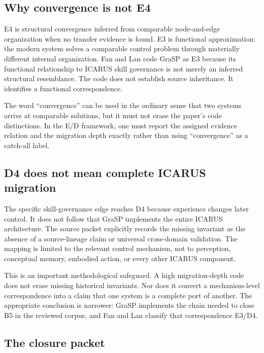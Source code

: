 \subsection{Why convergence is not E4}

E4 is structural convergence inferred from comparable node-and-edge organization when no transfer evidence is found. E3 is functional approximation: the modern system solves a comparable control problem through materially different internal organization. Fan and Lan code GraSP as E3 because its functional relationship to ICARUS skill governance is not merely an inferred structural resemblance. The code does not establish source inheritance. It identifies a functional correspondence.

The word “convergence” can be used in the ordinary sense that two systems arrive at comparable solutions, but it must not erase the paper's code distinctions. In the E/D framework, one must report the assigned evidence relation and the migration depth exactly rather than using “convergence” as a catch-all label.

\subsection{D4 does not mean complete ICARUS migration}

The specific skill-governance edge reaches D4 because experience changes later control. It does not follow that GraSP implements the entire ICARUS architecture. The source packet explicitly records the missing invariant as the absence of a source-lineage claim or universal cross-domain validation. The mapping is limited to the relevant control mechanism, not to perception, conceptual memory, embodied action, or every other ICARUS component.

This is an important methodological safeguard. A high migration-depth code does not erase missing historical invariants. Nor does it convert a mechanism-level correspondence into a claim that one system is a complete port of another. The appropriate conclusion is narrower: GraSP implements the chain needed to close B5 in the reviewed corpus, and Fan and Lan classify that correspondence E3/D4.

\subsection{The closure packet}

